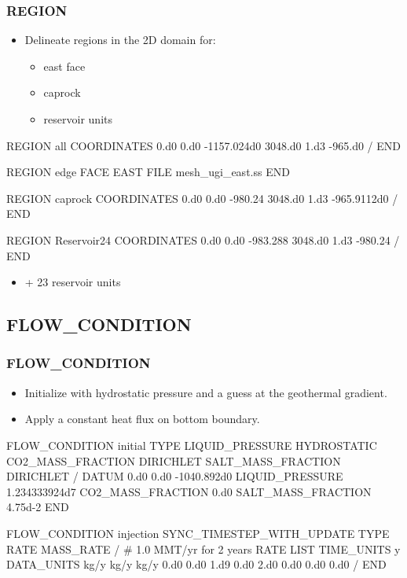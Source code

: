 \documentclass{beamer}
\begin{document}
\begin{frame}\frametitle{REGION}

\begin{itemize}
  \item Delineate regions in the 2D domain for:
  \begin{itemize}
    \item east face
    \item caprock
    \item reservoir units
  \end{itemize}
\end{itemize}

\begin{semiverbatim}
REGION all
  COORDINATES
    0.d0    0.d0 -1157.024d0
    3048.d0 1.d3 -965.d0
  /
END
\newpage

REGION edge
  FACE EAST
  FILE mesh_ugi_east.ss
END

\newpage
REGION caprock
  COORDINATES
    0.d0    0.d0 -980.24
    3048.d0 1.d3 -965.9112d0
  /
END

REGION Reservoir24
  COORDINATES
    0.d0    0.d0 -983.288
    3048.d0 1.d3 -980.24
  /
END
\end{semiverbatim}

\begin{itemize}
  \item + 23 reservoir units
\end{itemize}

\end{frame}

\subsection{FLOW\_CONDITION}

\begin{frame}\frametitle{FLOW\_CONDITION}

\begin{itemize}
\item Initialize with hydrostatic pressure and a guess at the geothermal gradient.
\item Apply a constant heat flux on bottom boundary.
\end{itemize}

\newpage
\begin{semiverbatim}
FLOW_CONDITION initial
  TYPE
    LIQUID_PRESSURE HYDROSTATIC
    CO2_MASS_FRACTION DIRICHLET
    SALT_MASS_FRACTION DIRICHLET
  /
  DATUM 0.d0 0.d0 -1040.892d0
  LIQUID_PRESSURE 1.234333924d7
  CO2_MASS_FRACTION 0.d0
  SALT_MASS_FRACTION 4.75d-2
END

\newpage
FLOW_CONDITION injection
  SYNC_TIMESTEP_WITH_UPDATE
  TYPE
    RATE MASS_RATE
  /
  # 1.0 MMT/yr for 2 years
  RATE LIST
    TIME_UNITS y
    DATA_UNITS kg/y kg/y kg/y
    0.d0 0.d0 1.d9 0.d0
    2.d0 0.d0 0.d0 0.d0
  /
END
\end{semiverbatim}

\end{frame}
\end{document}
